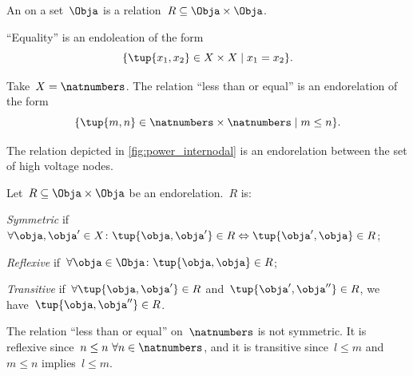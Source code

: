 \begin{definition}[Endorelation]\label{def:endorelation}
    An \emph{} on a set~$\Obja$ is a relation~$R\subseteq \Obja\times \Obja$.
\end{definition}

\begin{example}
    ``Equality'' is an endoleation of the form
    \begin{equation*}
        \{\tup{x_1,x_2}\in X\times X\mid x_1=x_2\}.
    \end{equation*}
\end{example}

\begin{example}
    Take~$X=\natnumbers$. The relation ``less than or equal'' is an endorelation of the form
    \begin{equation*}
        \{\tup{m,n}\in \natnumbers\times \natnumbers\mid m\leq n\}.
    \end{equation*}
\end{example}

\begin{example}
    The relation depicted in \cref{fig:power_internodal} is an endorelation between the set of high voltage nodes.
\end{example}

\begin{definition}\label{def:properties-endorelations}
    Let~$R\subseteq \Obja\times \Obja$ be an endorelation.~$R$ is:
    \begin{compactitem}
        \item \emph{Symmetric} if~$\forall \obja, \obja'\in X\colon \tup{\obja,\obja'}\in R \Leftrightarrow \tup{\obja',\obja}\in R$;
        \item \emph{Reflexive} if~$\forall \obja\in \Obja\colon \tup{\obja,\obja}\in R$;
        \item \emph{Transitive} if~$\forall \tup{\obja,\obja'}\in R$ and~$\tup{\obja',\obja''}\in R$, we have~$\tup{\obja, \obja''}\in R$.
    \end{compactitem}
\end{definition}

\begin{example}
    The relation ``less than or equal'' on~$\natnumbers$ is not symmetric. It is reflexive since~$n\leq n \ \forall n\in \natnumbers$, and it is transitive since~$l\leq m$ and~$m\leq n$ implies~$l\leq m$.
\end{example}

